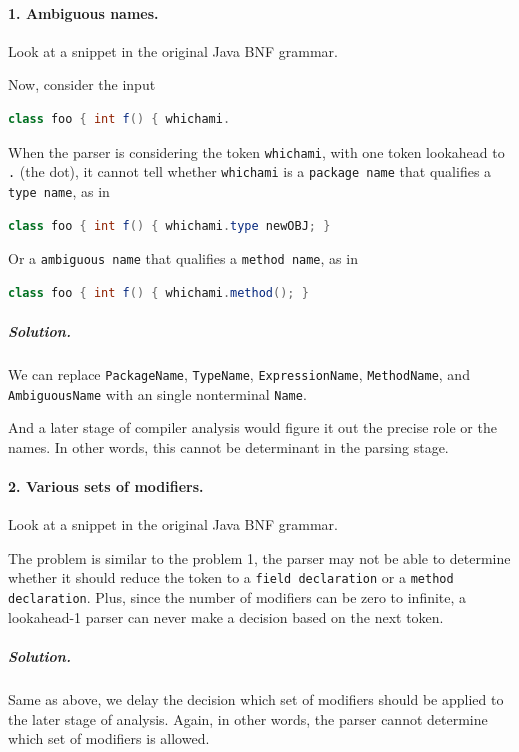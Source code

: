 \documentclass[12pt]{article}
\begin{document}
\paragraph{1. Ambiguous names.}
Look at a snippet in the original Java BNF grammar.



Now, consider the input

\begin{lstlisting}[language=Java]
class foo { int f() { whichami.
\end{lstlisting}

When the parser is considering the token \texttt{whichami}, with one token lookahead to \texttt{.} (the dot), it cannot tell whether \texttt{whichami} is a \texttt{package name} that qualifies a \texttt{type name}, as in

\begin{lstlisting}[language=Java]
class foo { int f() { whichami.type newOBJ; }
\end{lstlisting}

Or a \texttt{ambiguous name} that qualifies a \texttt{method name}, as in

\begin{lstlisting}[language=Java]
class foo { int f() { whichami.method(); }
\end{lstlisting}

\subparagraph{Solution.} We can replace \texttt{PackageName}, \texttt{TypeName}, \texttt{ExpressionName}, \texttt{MethodName}, and \texttt{AmbiguousName} with an single nonterminal \texttt{Name}.



And a later stage of compiler analysis would figure it out the precise role or the names. In other words, this cannot be determinant in the parsing stage.

\paragraph{2. Various sets of modifiers.}
Look at a snippet in the original Java BNF grammar.

The problem is similar to the problem 1, the parser may not be able to determine whether it should reduce the token to a \texttt{field declaration} or a \texttt{method declaration}. Plus, since the number of modifiers can be zero to infinite, a lookahead-1 parser can never make a decision based on the next token.
\subparagraph{Solution.} Same as above, we delay the decision which set of modifiers should be applied to the later stage of analysis. Again, in other words, the parser cannot determine which set of modifiers is allowed.
\end{document}
